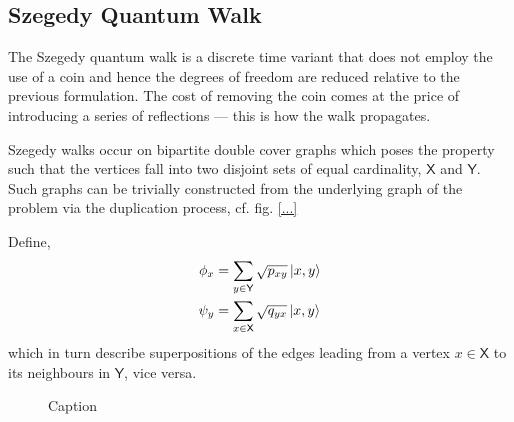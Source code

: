 \documentclass{article}
\begin{document}
\subsection{Szegedy Quantum Walk}
The Szegedy quantum walk is a discrete time variant that does not employ the use of a coin and hence the degrees of freedom are reduced relative to the previous formulation. The cost of removing the coin comes at the price of introducing a series of reflections --- this is how the walk propagates.

Szegedy walks occur on bipartite double cover graphs which poses the property such that the vertices fall into two disjoint sets of equal cardinality, $\mathsf{X}$ and $\mathsf{Y}$. Such graphs can be trivially constructed from the underlying graph of the problem via the duplication process, cf. fig. \ref{...}

Define,
\begin{align}
    \phi_x &= \sum_{y \in \mathsf{Y}} \sqrt{p_{xy}}\ket{x,y} \\
    \psi_y &= \sum_{x\in\mathsf{X}} \sqrt{q_{yx}} \ket{x,y}
\end{align}
which in turn describe superpositions of the edges leading from a vertex $x\in\mathsf{X}$ to its neighbours in $\mathsf{Y}$, vice versa. 

\begin{figure}[h!]
    \centering
    \caption{Caption}
    \label{fig:enter-label}
\end{figure}

    
\end{document}
